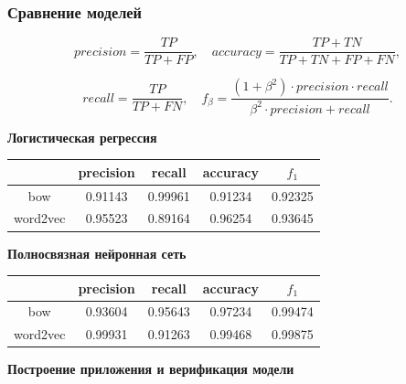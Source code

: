 \documentclass[compress,professionalfont]{beamer}
\begin{document}
\begin{frame}
\frametitle{Сравнение моделей}

$$
precision = \dfrac{TP}{TP + FP}, \quad accuracy= \dfrac{TP+TN}{TP+TN+FP+FN},
$$

$$
recall = \dfrac{TP}{TP + FN}, \quad f_{\beta} = \dfrac{(1 + \beta^2) \cdot precision \cdot recall}{\beta^2 \cdot precision + recall}.
$$

\begin{center}
\textbf{Логистическая регрессия}

  \begin{tabular}{ | c | c | c | c | c |}
    \hline
               & precision & recall & accuracy & $f_1$ \\ \hline
     bow       & 0.91143 & 0.99961 & 0.91234 & 0.92325 \\ \hline
     word2vec & 0.95523 & 0.89164 & 0.96254 & 0.93645 \\ \hline
  \end{tabular}

\vspace{.5cm}

\textbf{Полносвязная нейронная сеть}
  \begin{tabular}{ | c | c | c | c | c |}
    \hline
               & precision & recall & accuracy & $f_1$ \\ \hline
     bow       & 0.93604 & 0.95643 & 0.97234 & 0.99474 \\ \hline
     word2vec & 0.99931 & 0.91263 & 0.99468 & 0.99875 \\ \hline
  \end{tabular}
\end{center}

\end{frame}

\begin{frame}

\begin{center}
\Huge\bf Построение приложения и верификация модели
\end{center}

\end{frame}
\end{document}

